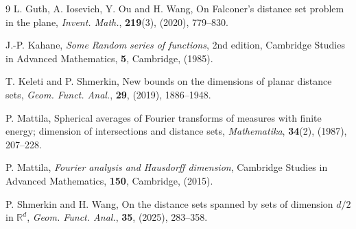 \documentclass[11pt]{amsart}
\numberwithin{equation}{section}
\newcommand{\rd}{\mathbb{R}^d}
\theoremstyle{plain}
\theoremstyle{remark}
\begin{document}
\begin{thebibliography}{9}
L. Guth, A. Iosevich, Y. Ou and H. Wang, 
On Falconer's distance set problem in the plane, \emph{Invent. Math.}, {\bf 219}(3), (2020), 779--830.


J.-P. Kahane, \emph{Some Random series of functions}, 2nd edition, Cambridge Studies in Advanced Mathematics, {\bf 5}, Cambridge, (1985).

T. Keleti and P. Shmerkin,
New bounds on the dimensions of planar distance sets,
\emph{Geom. Funct. Anal.}, {\bf 29}, (2019),   1886--1948.

P. Mattila, Spherical averages of Fourier transforms of measures with finite energy; dimension of intersections and distance sets, \emph{Mathematika}, {\bf 34}(2),  (1987),  207--228. 

P. Mattila, \emph{Fourier analysis and Hausdorff dimension}, Cambridge Studies in Advanced Mathematics, {\bf 150}, Cambridge, (2015).

P. Shmerkin and  H. Wang, On the distance sets spanned by sets of dimension $d/2$ in $\rd$, \emph{Geom. Funct. Anal.}, {\bf 35}, (2025),   283--358.

\end{thebibliography}
\end{document}

